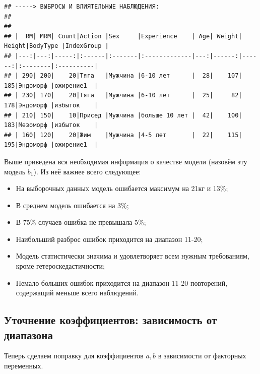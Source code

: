\documentclass[
]{article}
\begin{document}
\begin{verbatim}
## -----> ВЫБРОСЫ И ВЛИЯТЕЛЬНЫЕ НАБЛЮДЕНИЯ:
## 
## 
## |  RM| MRM| Count|Action |Sex     |Experience    | Age| Weight| Height|BodyType |IndexGroup |
## |---:|---:|-----:|:------|:-------|:-------------|---:|------:|------:|:--------|:----------|
## | 290| 200|    20|Тяга   |Мужчина |6-10 лет      |  28|    107|    185|Эндоморф |ожирение1  |
## | 230| 170|    20|Тяга   |Мужчина |6-10 лет      |  25|     82|    178|Эндоморф |избыток    |
## | 210| 150|    10|Присед |Мужчина |больше 10 лет |  42|    100|    183|Мезоморф |избыток    |
## | 160| 120|    20|Жим    |Мужчина |4-5 лет       |  22|    115|    195|Эндоморф |ожирение1  |
\end{verbatim}

Выше приведена вся необходимая информация о качестве модели (назовём эту
модель \(b_1\)). Из неё важнее всего следующее:

\begin{itemize}
\item
  На выборочных данных модель ошибается максимум на 21кг и 13\%;
\item
  В среднем модель ошибается на 3\%;
\item
  В 75\% случаев ошибка не превышала 5\%;
\item
  Наибольший разброс ошибок приходится на диапазон 11-20;
\item
  Модель статистически значима и удовлетворяет всем нужным требованиям,
  кроме гетероскедастичности;
\item
  Немало больших ошибок приходится на диапазон 11-20 повторений,
  содержащий меньше всего наблюдений.
\end{itemize}

\hypertarget{ux443ux442ux43eux447ux43dux435ux43dux438ux435-ux43aux43eux44dux444ux444ux438ux446ux438ux435ux43dux442ux43eux432-ux437ux430ux432ux438ux441ux438ux43cux43eux441ux442ux44c-ux43eux442-ux434ux438ux430ux43fux430ux437ux43eux43dux430}{%
\subsection{Уточнение коэффициентов: зависимость от
диапазона}\label{ux443ux442ux43eux447ux43dux435ux43dux438ux435-ux43aux43eux44dux444ux444ux438ux446ux438ux435ux43dux442ux43eux432-ux437ux430ux432ux438ux441ux438ux43cux43eux441ux442ux44c-ux43eux442-ux434ux438ux430ux43fux430ux437ux43eux43dux430}}

Теперь сделаем поправку для коэффициентов \(a,b\) в зависимости от
факторных переменных.
\end{document}
